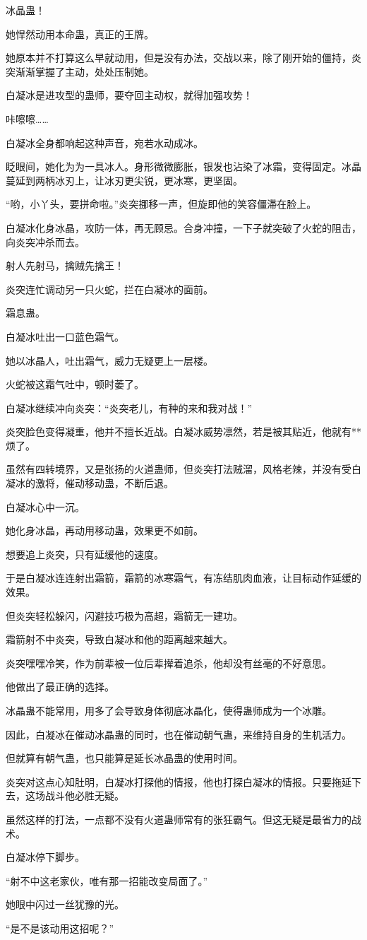 \begin{this_body}
冰晶蛊！

她悍然动用本命蛊，真正的王牌。

她原本并不打算这么早就动用，但是没有办法，交战以来，除了刚开始的僵持，炎突渐渐掌握了主动，处处压制她。

白凝冰是进攻型的蛊师，要夺回主动权，就得加强攻势！

咔嚓嚓……

白凝冰全身都响起这种声音，宛若水动成冰。

眨眼间，她化为为一具冰人。身形微微膨胀，银发也沾染了冰霜，变得固定。冰晶蔓延到两柄冰刃上，让冰刃更尖锐，更冰寒，更坚固。

“哟，小丫头，要拼命啦。”炎突挪移一声，但旋即他的笑容僵滞在脸上。

白凝冰化身冰晶，攻防一体，再无顾忌。合身冲撞，一下子就突破了火蛇的阻击，向炎突冲杀而去。

射人先射马，擒贼先擒王！

炎突连忙调动另一只火蛇，拦在白凝冰的面前。

霜息蛊。

白凝冰吐出一口蓝色霜气。

她以冰晶人，吐出霜气，威力无疑更上一层楼。

火蛇被这霜气吐中，顿时萎了。

白凝冰继续冲向炎突：“炎突老儿，有种的来和我对战！”

炎突脸色变得凝重，他并不擅长近战。白凝冰威势凛然，若是被其贴近，他就有**烦了。

虽然有四转境界，又是张扬的火道蛊师，但炎突打法贼溜，风格老辣，并没有受白凝冰的激将，催动移动蛊，不断后退。

白凝冰心中一沉。

她化身冰晶，再动用移动蛊，效果更不如前。

想要追上炎突，只有延缓他的速度。

于是白凝冰连连射出霜箭，霜箭的冰寒霜气，有冻结肌肉血液，让目标动作延缓的效果。

但炎突轻松躲闪，闪避技巧极为高超，霜箭无一建功。

霜箭射不中炎突，导致白凝冰和他的距离越来越大。

炎突嘿嘿冷笑，作为前辈被一位后辈撵着追杀，他却没有丝毫的不好意思。

他做出了最正确的选择。

冰晶蛊不能常用，用多了会导致身体彻底冰晶化，使得蛊师成为一个冰雕。

因此，白凝冰在催动冰晶蛊的同时，也在催动朝气蛊，来维持自身的生机活力。

但就算有朝气蛊，也只能算是延长冰晶蛊的使用时间。

炎突对这点心知肚明，白凝冰打探他的情报，他也打探白凝冰的情报。只要拖延下去，这场战斗他必胜无疑。

虽然这样的打法，一点都不没有火道蛊师常有的张狂霸气。但这无疑是最省力的战术。

白凝冰停下脚步。

“射不中这老家伙，唯有那一招能改变局面了。”

她眼中闪过一丝犹豫的光。

“是不是该动用这招呢？”

\end{this_body}

